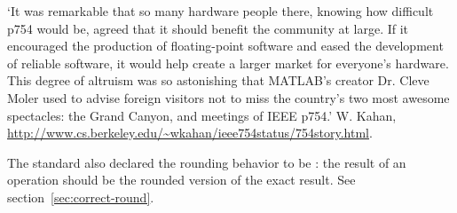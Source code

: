 \begin{remark}
  `It was remarkable that so many hardware
  people there, knowing how difficult p754 would be, agreed that it
  should benefit the community at large. If it encouraged the
  production of floating-point software and eased the development of
  reliable software, it would help create a larger market for
  everyone's hardware. This degree of altruism was so astonishing that
  MATLAB's creator Dr. Cleve Moler used to advise foreign visitors not
  to miss the country's two most awesome spectacles: the Grand Canyon,
  and meetings of IEEE p754.' W. Kahan,
  \url{http://www.cs.berkeley.edu/~wkahan/ieee754status/754story.html}.
\end{remark}


The standard also declared the rounding behavior
to be : the result of an operation should be the
rounded version of the exact result.
See section~\ref{sec:correct-round}.


